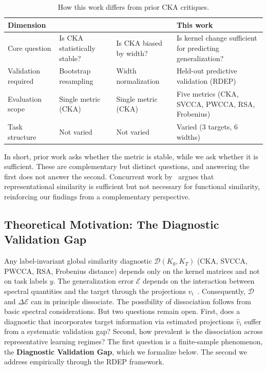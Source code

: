 \documentclass[twoside,11pt]{article}
\begin{document}
\begin{table}[h]
\centering\small
\caption{How this work differs from prior CKA critiques.}
\label{tab:related_diff}
\begin{tabular}{p{3cm}p{3.2cm}p{3.2cm}p{3.2cm}}
\toprule
Dimension & \cite{davari2022reliability} & \cite{ding2021grounding} & This work \\
\midrule
Core question & Is CKA statistically stable? & Is CKA biased by width? & Is kernel change sufficient for predicting generalization? \\
Validation required & Bootstrap resampling & Width normalization & Held-out predictive validation (RDEP) \\
Evaluation scope & Single metric (CKA) & Single metric (CKA) & Five metrics (CKA, SVCCA, PWCCA, RSA, Frobenius) \\
Task structure & Not varied & Not varied & Varied (3 targets, 6 widths) \\
\bottomrule
\end{tabular}
\end{table}

In short, prior work asks whether the metric is stable, while we ask whether it is sufficient. These are complementary but distinct questions, and answering the first does not answer the second.  Concurrent work by~\citet{bridging2026usable} argues that representational similarity is sufficient but not necessary for functional similarity, reinforcing our findings from a complementary perspective.

\subsection{Theoretical Motivation: The Diagnostic Validation Gap}
\label{sec:proposition}

Any label-invariant global similarity diagnostic $\mathcal{D}(K_0, K_T)$ (CKA, SVCCA, PWCCA, RSA, Frobenius distance) depends only on the kernel matrices and not on task labels $y$. The generalization error $\mathcal{E}$ depends on the interaction between spectral quantities and the target through the projections $v_i$~\citep{canatar2021spectral}.  Consequently, $\mathcal{D}$ and $\Delta\mathcal{E}$ can in principle dissociate.  The possibility of dissociation follows from basic spectral considerations. But two questions remain open. First, does a diagnostic that incorporates target information via estimated projections $\hat{v}_i$ suffer from a systematic validation gap? Second, how prevalent is the dissociation across representative learning regimes?  The first question is a finite-sample phenomenon, the \textbf{Diagnostic Validation Gap}, which we formalize below.  The second we address empirically through the RDEP framework.
\end{document}
